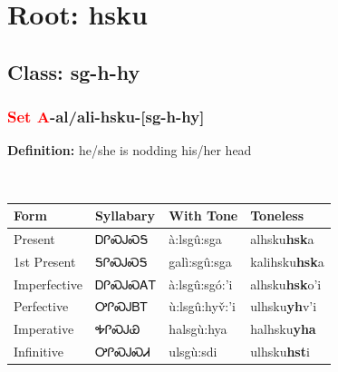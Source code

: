 \needspace{4in}
\section*{Root: hsku}
\nopagebreak
{}
\needspace{3in}
\subsection*{Class: sg-h-hy}
\nopagebreak
\needspace{2in}
\subsubsection*{\textcolor{Red}{Set A}{-}al/ali{-}\textbf{hsku}{-}[sg-h-hy]}
\nopagebreak
\textbf{Definition: } he/she is nodding his/her head
\\[0.5em]
\begin{tabularx}{\textwidth}{l X X X}%
\toprule%
\textbf{Form}&\textbf{Syllabary}&\textbf{With Tone}&\textbf{Toneless}\\%
\midrule%
Present&ᎠᎵᏍᎫᏍᎦ&à:lsgû:sga&alhsku\textbf{hsk}a\\%
1st Present&ᎦᎵᏍᎫᏍᎦ&galì:sgû:sga&kalihsku\textbf{hsk}a\\%
Imperfective&ᎠᎵᏍᎫᏍᎪᎢ&à:lsgû:sgó:’i&alhsku\textbf{hsk}o'i\\%
Perfective&ᎤᎵᏍᎫᏴᎢ&ù:lsgû:hyv̌:’i&ulhsku\textbf{yh}v'i\\%
Imperative&ᎭᎵᏍᎫᏯ&halsgù:hya&halhsku\textbf{yha}\\%
Infinitive&ᎤᎵᏍᎫᏍᏗ&ulsgù:sdi&ulhsku\textbf{hst}i\\%
\bottomrule%
\end{tabularx}
\\[1em]